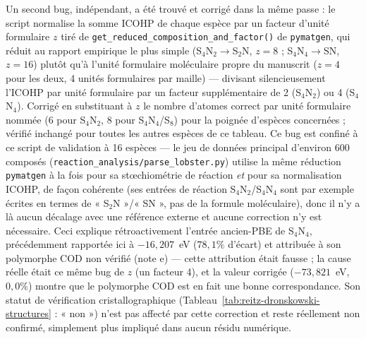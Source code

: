 \indent Un second bug, indépendant, a été trouvé et corrigé dans la même passe : le script normalise la somme ICOHP de chaque espèce par un facteur d'unité formulaire $z$ tiré de \texttt{get\_reduced\_composition\_and\_factor()} de \texttt{pymatgen}, qui réduit au rapport empirique le plus simple (S$_4$N$_2\to$S$_2$N, $z=8$ ; S$_4$N$_4\to$SN, $z=16$) plutôt qu'à l'unité formulaire moléculaire propre du manuscrit ($z=4$ pour les deux, 4 unités formulaires par maille) --- divisant silencieusement l'ICOHP par unité formulaire par un facteur supplémentaire de 2 (S$_4$N$_2$) ou 4 (S$_4$N$_4$). Corrigé en substituant à $z$ le nombre d'atomes correct par unité formulaire nommée (6 pour S$_4$N$_2$, 8 pour S$_4$N$_4$/S$_8$) pour la poignée d'espèces concernées ; vérifié inchangé pour toutes les autres espèces de ce tableau. Ce bug est confiné à ce script de validation à 16 espèces --- le jeu de données principal d'environ 600 composés (\texttt{reaction\_analysis/parse\_lobster.py}) utilise la même réduction \texttt{pymatgen} à la fois pour sa stœchiométrie de réaction \emph{et} pour sa normalisation ICOHP, de façon cohérente (ses entrées de réaction S$_4$N$_2$/S$_4$N$_4$ sont par exemple écrites en termes de « S$_2$N »/« SN », pas de la formule moléculaire), donc il n'y a là aucun décalage avec une référence externe et aucune correction n'y est nécessaire. Ceci explique rétroactivement l'entrée ancien-PBE de S$_4$N$_4$, précédemment rapportée ici à $-16{,}207$~eV ($78{,}1\%$ d'écart) et attribuée à son polymorphe COD non vérifié (note e) --- cette attribution était fausse ; la cause réelle était ce même bug de $z$ (un facteur 4), et la valeur corrigée ($-73{,}821$~eV, $0{,}0\%$) montre que le polymorphe COD est en fait une bonne correspondance. Son statut de vérification cristallographique (Tableau~\ref{tab:reitz-dronskowski-structures} : « non ») n'est pas affecté par cette correction et reste réellement non confirmé, simplement plus impliqué dans aucun résidu numérique.

